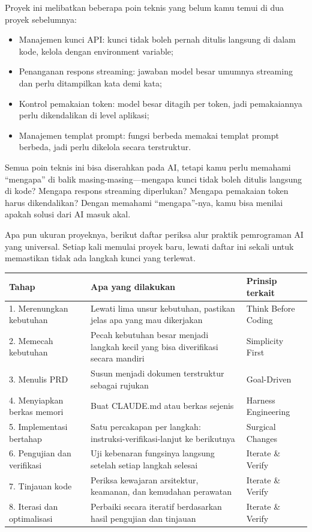 
Proyek ini melibatkan beberapa poin teknis yang belum kamu temui di dua proyek sebelumnya:

\begin{itemize}
  \item Manajemen kunci API: kunci tidak boleh pernah ditulis langsung di dalam kode, kelola dengan environment variable;
  \item Penanganan respons streaming: jawaban model besar umumnya streaming dan perlu ditampilkan kata demi kata;
  \item Kontrol pemakaian token: model besar ditagih per token, jadi pemakaiannya perlu dikendalikan di level aplikasi;
  \item Manajemen templat prompt: fungsi berbeda memakai templat prompt berbeda, jadi perlu dikelola secara terstruktur.
\end{itemize}

Semua poin teknis ini bisa diserahkan pada AI, tetapi kamu perlu memahami “mengapa” di balik masing-masing—mengapa kunci tidak boleh ditulis langsung di kode? Mengapa respons streaming diperlukan? Mengapa pemakaian token harus dikendalikan? Dengan memahami “mengapa”-nya, kamu bisa menilai apakah solusi dari AI masuk akal.


Apa pun ukuran proyeknya, berikut daftar periksa alur praktik pemrograman AI yang universal. Setiap kali memulai proyek baru, lewati daftar ini sekali untuk memastikan tidak ada langkah kunci yang terlewat.

\begin{center}
\begin{tabularx}{\linewidth}{|X|X|X|}
\hline
\textbf{Tahap} & \textbf{Apa yang dilakukan} & \textbf{Prinsip terkait} \tabularnewline
\hline
1. Merenungkan kebutuhan & Lewati lima unsur kebutuhan, pastikan jelas apa yang mau dikerjakan & Think Before Coding \tabularnewline
2. Memecah kebutuhan & Pecah kebutuhan besar menjadi langkah kecil yang bisa diverifikasi secara mandiri & Simplicity First \tabularnewline
3. Menulis PRD & Susun menjadi dokumen terstruktur sebagai rujukan & Goal-Driven \tabularnewline
4. Menyiapkan berkas memori & Buat CLAUDE.md atau berkas sejenis & Harness Engineering \tabularnewline
5. Implementasi bertahap & Satu percakapan per langkah: instruksi-verifikasi-lanjut ke berikutnya & Surgical Changes \tabularnewline
6. Pengujian dan verifikasi & Uji kebenaran fungsinya langsung setelah setiap langkah selesai & Iterate \& Verify \tabularnewline
7. Tinjauan kode & Periksa kewajaran arsitektur, keamanan, dan kemudahan perawatan & Iterate \& Verify \tabularnewline
8. Iterasi dan optimalisasi & Perbaiki secara iteratif berdasarkan hasil pengujian dan tinjauan & Iterate \& Verify \tabularnewline
\hline
\end{tabularx}
\end{center}

